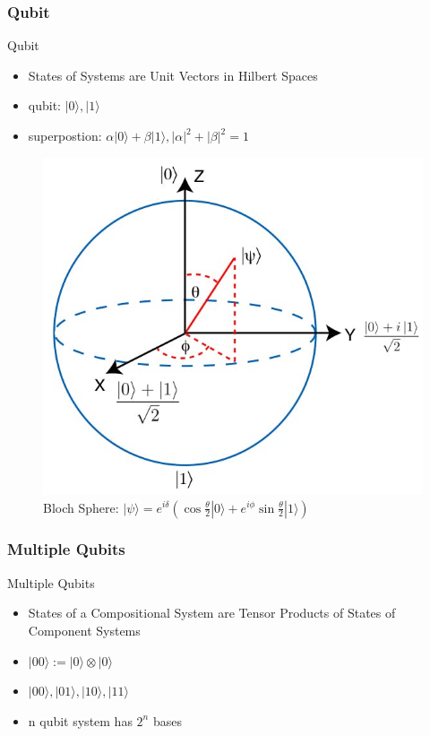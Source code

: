 \documentclass{beamer}
\newcommand{\<}{\langle}
\renewcommand{\>}{\rangle}
\begin{document}
\subsubsection{Qubit}
\begin{frame}{Qubit}

\begin{itemize}
    \item States of Systems are Unit Vectors in Hilbert Spaces
    \item qubit: $|0\>, |1\>$ 
    \item superpostion: $\alpha|0\>+\beta|1\>, |\alpha|^2+|\beta|^2=1$
\end{itemize}

\begin{figure}
    \centering
    \includegraphics[width=0.4\columnwidth]{bloch.jpg}
    \caption{Bloch Sphere: $|\psi\> = e^{i\delta}(\cos\frac\theta2|0\>+e^{i\phi}\sin\frac\theta2|1\>)$}
    \label{fig:bloch}
\end{figure}

\end{frame}



\subsubsection{Multiple Qubits}
\begin{frame}{Multiple Qubits}

\begin{itemize}
    \item States of a Compositional System are Tensor Products of States of Component Systems
    \item $|00\rangle := |0\rangle \otimes |0\rangle$
    \item $|00\rangle, |01\rangle, |10\rangle, |11\rangle$
    \item n qubit system has $2^n$ bases
\end{itemize}

\end{frame}
\end{document}
